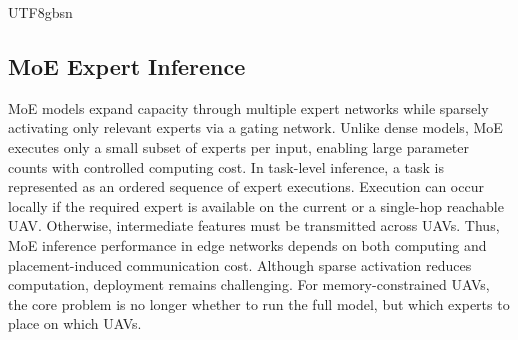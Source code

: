 \documentclass[journal]{IEEEtran}
\begin{document}
\begin{CJK*}{UTF8}{gbsn}




\subsection{MoE Expert Inference}

MoE models expand capacity through multiple expert networks while sparsely activating only relevant experts via a gating network{\color{black}\cite{R16,R17}}. Unlike dense models, MoE executes only a small subset of experts per input, enabling large parameter counts with controlled computing cost{\color{black}\cite{R18}}.
In task-level inference, a task is represented as an ordered sequence of expert executions. Execution can occur locally if the required expert is available on the current or a single-hop reachable UAV. Otherwise, intermediate features must be transmitted across UAVs{\color{black}\cite{R19}}. Thus, MoE inference performance in edge networks depends on both computing and placement-induced communication cost.
Although sparse activation reduces computation, deployment remains challenging. For memory-constrained UAVs, the core problem is no longer whether to run the full model, but which experts to place on which UAVs.


\end{CJK*}
\end{document}
